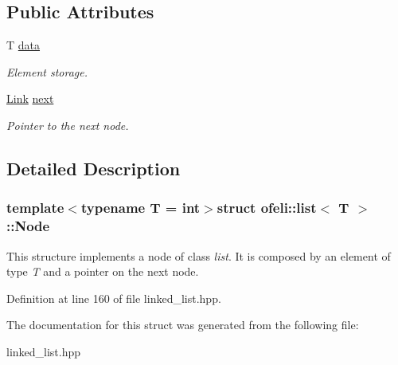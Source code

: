 \subsection*{Public Attributes}
\begin{DoxyCompactItemize}
\item 
\hypertarget{structofeli_1_1list_1_1_node_a50e84fcefcfc088b1beb4db228da2665}{T \hyperlink{structofeli_1_1list_1_1_node_a50e84fcefcfc088b1beb4db228da2665}{data}}\label{structofeli_1_1list_1_1_node_a50e84fcefcfc088b1beb4db228da2665}

\begin{DoxyCompactList}\small\item\em Element storage. \end{DoxyCompactList}\item 
\hypertarget{structofeli_1_1list_1_1_node_a6c04294f1a7e9fe11737c4e041e93f03}{\hyperlink{classofeli_1_1list_a7765ecb875543506d04dbd466f754503}{Link} \hyperlink{structofeli_1_1list_1_1_node_a6c04294f1a7e9fe11737c4e041e93f03}{next}}\label{structofeli_1_1list_1_1_node_a6c04294f1a7e9fe11737c4e041e93f03}

\begin{DoxyCompactList}\small\item\em Pointer to the next node. \end{DoxyCompactList}\end{DoxyCompactItemize}


\subsection{Detailed Description}
\subsubsection*{template$<$typename T = int$>$struct ofeli\-::list$<$ T $>$\-::\-Node}

This structure implements a node of class {\itshape list}. It is composed by an element of type {\itshape T} and a pointer on the next node. 

Definition at line 160 of file linked\-\_\-list.\-hpp.



The documentation for this struct was generated from the following file\-:\begin{DoxyCompactItemize}
\item 
linked\-\_\-list.\-hpp\end{DoxyCompactItemize}
